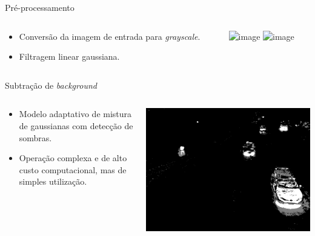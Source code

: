 \begin{frame}{Pré-processamento}
  \begin{columns}[T]
    \begin{column}{.5\textwidth}
      \begin{itemize}
        \item<1-> Conversão da imagem de entrada para \textit{grayscale}.
        \item<2-> Filtragem linear gaussiana.
      \end{itemize}
    \end{column}
    \begin{column}{.5\textwidth}
      \begin{block}{}
        \includegraphics<1>[width=\textwidth]{imgs/frame_gray.png}
        \includegraphics<2>[width=\textwidth]{imgs/gray.png}
      \end{block}
    \end{column}
  \end{columns}
\end{frame}

\begin{frame}{Subtração de \textit{background}}
  \begin{columns}[T]
    \begin{column}{.5\textwidth}
      \begin{itemize}
        \item Modelo adaptativo de mistura de gaussianas com detecção de sombras.
        \item Operação complexa e de alto custo computacional, mas de simples utilização.
      \end{itemize}
    \end{column}
    \begin{column}{.5\textwidth}
      \begin{block}{}
        \includegraphics[width=\textwidth]{imgs/foreground.png}
      \end{block}
    \end{column}
  \end{columns}
\end{frame}

